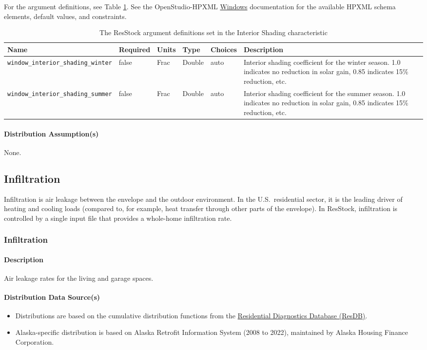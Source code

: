 For the argument definitions, see Table \ref{table:hc_arg_def_int_shad}. See the OpenStudio-HPXML \href{https://openstudio-hpxml.readthedocs.io/en/v1.8.1/workflow_inputs.html#hpxml-windows}{Windows} documentation for the available HPXML schema elements, default values, and constraints.
\begin{longtable}[]{|p{3.5cm}|p{1.5cm}|p{1.5cm}|p{1.5cm}|p{1.5cm}|p{}|} \caption{The ResStock argument definitions set in the Interior Shading characteristic} \label{table:hc_arg_def_int_shad} \\

\toprule\noalign{}
Name & Required & Units & Type & Choices & Description \\
\midrule\noalign{}
\endhead
\bottomrule\noalign{}
\endlastfoot
\texttt{window\_interior\_shading\_winter} & false & Frac & Double &
auto & Interior shading coefficient for the winter season. 1.0 indicates
no reduction in solar gain, 0.85 indicates 15\% reduction, etc. \\
\hline
\texttt{window\_interior\_shading\_summer} & false & Frac & Double &
auto & Interior shading coefficient for the summer season. 1.0 indicates
no reduction in solar gain, 0.85 indicates 15\% reduction, etc.  \\
\end{longtable}
\paragraph{Distribution Assumption(s)}
None. 
\subsection{Infiltration}
Infiltration is air leakage between the envelope and the outdoor environment. In the U.S.~residential sector, it is the leading driver of heating and cooling loads (compared to, for example, heat transfer through other parts of the envelope). In ResStock, infiltration is controlled by a single input file that provides a whole-home infiltration rate. 
\subsubsection{Infiltration}\label{infiltration}
\paragraph{Description}
Air leakage rates for the living and garage spaces.
\paragraph{Distribution Data Source(s)}
\begin{itemize}
 
\item
  Distributions are based on the cumulative distribution functions from
  the \href{http://resdb.lbl.gov/}{Residential Diagnostics Database (ResDB)}.
\item
  Alaska-specific distribution is based on Alaska Retrofit Information
  System (2008 to 2022), maintained by Alaska Housing Finance
  Corporation.
\end{itemize}



